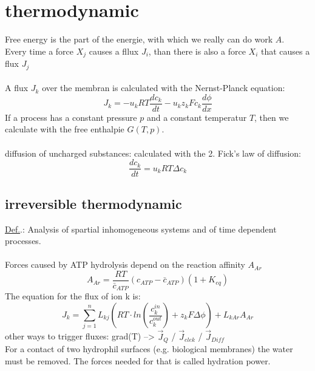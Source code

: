 \documentclass[12pt,a4paper,bibliography=totocnumbered]{scrartcl}
\begin{document}
\section{thermodynamic}
Free energy is the part of the energie, with which we really can do work $A$.\\

Every time a force $X_j$ causes a fllux $J_i$, than there is also a force $X_i$ that causes a flux $J_j$\\\\
A flux $J_k$ over the membran is calculated with the Nernst-Planck equation:
\begin{equation*}
J_k = -u_kRT\frac{dc_k}{dt} -u_kz_kFc_k\frac{d\phi}{dx}
\end{equation*}
If a process has a constant pressure $p$ and a constant temperatur $T$, then we calculate with the free enthalpie $G(T,p)$.\\\\
diffusion of uncharged substances: calculated with the 2. Fick's law of diffusion:
\begin{equation*}
\frac{dc_k}{dt}=u_kRT \Delta c_k
\end{equation*}

\subsection{irreversible thermodynamic}
\underline{Def.}.: Analysis of spartial inhomogeneous systems and of time dependent processes.\\\\
Forces caused by ATP hydrolysis depend on the reaction affinity $A_{Ar}$
\begin{equation*}
A_{Ar} = \frac{RT}{\bar{c}_{ATP}}(c_{ATP}-\bar{c}_{ATP})(1+K_{eq})
\end{equation*}
The equation for the flux of ion k is:
\begin{equation*}
J_k = \sum_{j=1}^n L_{kj}(RT\cdot ln\left(\frac{c_k^{in}}{c_k^{out}}\right) + z_kF\Delta \phi ) + L_{kAr}A_{Ar}
\end{equation*}
other ways to trigger fluxes:
grad(T) --> $\vec{J}_Q$ / $\vec{J}_{elek}$ / $\vec{J}_{Diff}$\\
For a contact of two hydrophil surfaces (e.g. biological membranes) the water must be removed. The forces needed for that is called hydration power.
\end{document}
